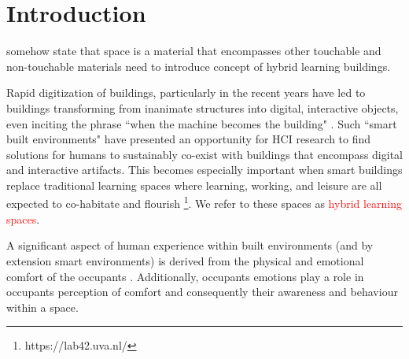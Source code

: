 \documentclass[acmconf, anonymous, review]{acmart}
\begin{document}



\maketitle

\section{Introduction}
{\color{red}somehow state that space is a material that encompasses other touchable and non-touchable materials}
{\color{red}need to introduce concept of hybrid learning buildings.}

Rapid digitization of buildings, particularly in the recent years have led to buildings transforming from inanimate structures into digital, interactive objects, even inciting the phrase ``when the machine becomes the building" \cite{nembrini2017human}. Such ``smart built environments" have presented an opportunity for HCI research to find solutions for humans to sustainably co-exist with buildings that encompass digital and interactive artifacts. This becomes especially important when smart buildings replace traditional learning spaces where learning, working, and leisure are all expected to co-habitate and flourish \footnote{https://lab42.uva.nl/}. We refer to these spaces as \textcolor{red}{hybrid learning spaces}. 

A significant aspect of human experience within built environments (and by extension smart environments) is derived from the physical and emotional comfort of the occupants \cite{alavi2017comfort}. Additionally, occupants emotions play a role in occupants perception of comfort and consequently their awareness and behaviour within a space. 
\end{document}

